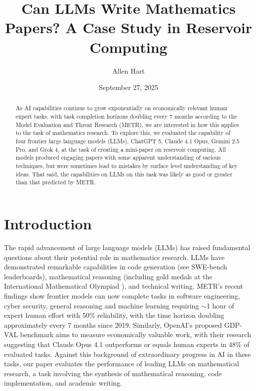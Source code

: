 \documentclass[11pt]{article}
\title{Can LLMs Write Mathematics Papers? A Case Study in Reservoir Computing}
\author{Allen Hart}
\date{September 27, 2025}
\begin{document}
\maketitle

\begin{abstract}
As AI capabilities continue to grow exponentially on economically relevant human expert tasks, with task completion horizons doubling every 7 months according to the Model Evaluation and Threat Research (METR), we are interested in how this applies to the task of mathematics research. To explore this, we evaluated the capability of four frontier large language models (LLMs), ChatGPT 5, Claude 4.1 Opus, Gemini 2.5 Pro, and Grok 4, at the task of creating a mini-paper on reservoir computing. All models produced engaging papers with some apparent understanding of various techniques, but were sometimes lead to mistakes by surface level understanding of key ideas. That said, the capabilities on LLMs on this task was likely as good or greater than that predicted by METR.
\end{abstract}

\section{Introduction}

The rapid advancement of large language models (LLMs) has raised fundamental questions about their potential role in mathematics research. LLMs have demonstrated remarkable capabilities in code generation (see SWE-bench \cite{jimenez2024} leaderboards), mathematical reasoning (including gold medals at the International Mathematical Olympiad \cite{deepmind2025imo,reuters2025imo}), and technical writing. 
METR's \cite{kwa2025metr} recent findings show frontier models can now complete tasks in software engineering, cyber security, general reasoning and machine learning requiring $\sim$1 hour of expert human effort with 50\% reliability, with the time horizon doubling approximately every 7 months since 2019. Similarly, OpenAI's proposed GDP-VAL benchmark aims to measure economically valuable work, with their research suggesting that Claude Opus 4.1 outperforms or equals human experts in 48\% of evaluated tasks. Against this background of extraordinary progress in AI in these tasks, our paper evaluates the performance of leading LLMs on mathematical research, a task involving the synthesis of mathematical reasoning, code implementation, and academic writing.
\end{document}
